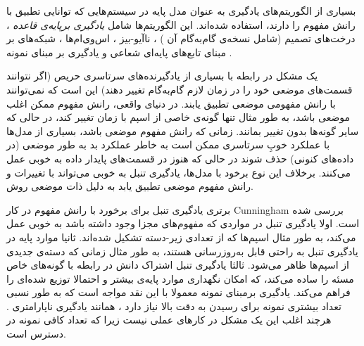 بسیاری از الگوریتم‌های یادگیری به عنوان مدل پایه
در سیستم‌هایی که توانایی تطبیق با رانش مفهوم را دارند، استفاده شده‌اند. این الگوریتم‌ها شامل 
\textit{
یادگیری برپایه‌ی قاعده
}
\cite{schlimmergranger1986}\cite{widmerkubat1993}\cite{widmerkubat1996}\cite{wangetal2003}، 
درخت‌های تصمیم
(شامل نسخه‌ی گام‌به‌گام آن
\cite{harriessammut1998} \cite{hultenetal2001} \cite{streetkim2001} \cite{koltermaloof2003} \cite{wangetal2003}
) ، 
ناآیو-بیز
\cite{koltermaloof2003} \cite{wangetal2003}، 
اس‌وی‌ام‌ها
\cite{klinkenberg2004}، 
شبکه‌های بر مبنای تابع‌های پایه‌ای شعاعی
\cite{kubatwidmer1994}
و یادگیری بر مبنای نمونه
\cite{ahaetal1991} \cite{salganicoff1997} \cite{cunninghametal2003}.


یک مشکل در رابطه با بسیاری از یادگیرنده‌های سرتاسری حریص
(اگر نتوانند قسمت‌های موضعی
خود را در زمان لازم گام‌به‌گام تغییر دهند) این است که نمی‌توانند با رانش مفهومی موضعی تطبیق یابند. در دنیای واقعی، رانش مفهوم ممکن اغلب موضعی باشد، به طور مثال تنها گونه‌ی خاصی از اسپم با زمان تغییر کند، در حالی که سایر گونه‌ها بدون تغییر بمانند. زمانی که رانش مفهوم موضعی باشد، بسیاری از مدل‌ها با عملکرد خوبِ سرتاسری
ممکن است به خاطر عملکرد بد به طور موضعی (در داده‌های کنونی) حذف شوند در حالی که هنوز در قسمت‌های پایدار داده به خوبی عمل می‌کنند. برخلاف این نوع برخود با مدل‌ها، یادگیری تنبل
به خوبی می‌تواند با تغییرات و رانش مفهوم موضعی تطبیق یابد به دلیل ذات موضعی
روش.


برتری یادگیری تنبل برای برخورد با رانش مفهوم در کار 
Cunningham
\cite{cunninghametal2003}
بررسی شده است. اولا یادگیری تنبل در مواردی که مفهوم‌های مجزا
وجود داشته باشد به خوبی عمل می‌کند، به طور مثال اسپم‌ها که از تعدادی زیر-دسته
تشکیل شده‌اند. ثانیا موارد پایه در یادگیری تنبل به راحتی قابل به‌روزرسانی
هستند، به طور مثال زمانی که دسته‌ی جدیدی از اسپم‌ها ظاهر می‌شود. ثالثا یادگیری تنبل اشتراک دانش در رابطه با گونه‌های خاص مسئه را ساده می‌کند، که امکان نگهداری موارد پایه‌ی بیشتر و احتمالا توزیع شده‌ای را فراهم می‌کند. یادگیری برمبنای نمونه معمولا با این نقد مواجه است که به طور نسبی تعداد بیشتری نمونه برای رسیدن به دقت بالا نیاز دارد
\cite{widmerkubat1996}
، همانند یادگیری ناپارامتری
. 
هرچند اغلب این یک مشکل در کارهای عملی نیست زیرا که تعداد کافی نمونه در دسترس است.

